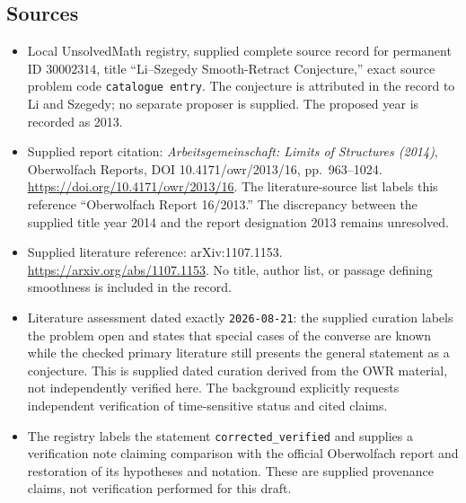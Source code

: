 \documentclass[11pt]{article}
\begin{document}
\subsection{Sources}
\begin{itemize}
\item Local UnsolvedMath registry, supplied complete source record for permanent ID \(30002314\), title ``Li--Szegedy Smooth-Retract Conjecture,'' exact source problem code \texttt{catalogue entry}. The conjecture is attributed in the record to Li and Szegedy; no separate proposer is supplied. The proposed year is recorded as 2013.
\item Supplied report citation: \emph{Arbeitsgemeinschaft: Limits of Structures (2014)}, Oberwolfach Reports, DOI 10.4171/owr/2013/16, pp.\ 963--1024. \url{https://doi.org/10.4171/owr/2013/16}. The literature-source list labels this reference ``Oberwolfach Report 16/2013.'' The discrepancy between the supplied title year 2014 and the report designation 2013 remains unresolved.
\item Supplied literature reference: arXiv:1107.1153. \url{https://arxiv.org/abs/1107.1153}. No title, author list, or passage defining smoothness is included in the record.
\item Literature assessment dated exactly \texttt{2026-08-21}: the supplied curation labels the problem open and states that special cases of the converse are known while the checked primary literature still presents the general statement as a conjecture. This is supplied dated curation derived from the OWR material, not independently verified here. The background explicitly requests independent verification of time-sensitive status and cited claims.
\item The registry labels the statement \texttt{corrected\_verified} and supplies a verification note claiming comparison with the official Oberwolfach report and restoration of its hypotheses and notation. These are supplied provenance claims, not verification performed for this draft.
\end{itemize}
\end{document}

